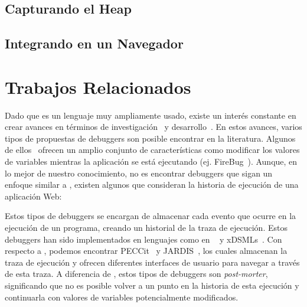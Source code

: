 \documentclass[conference]{IEEEtran}
\begin{document}
\subsection{Capturando el Heap}
\label{sec:heap}


\subsection{Integrando en un Navegador}


\bigskip

\section{Trabajos Relacionados}
\label{sec:rw}

Dado que \javascript es un lenguaje muy ampliamente usado, existe un inter\'es constante en crear avances en t\'erminos de investigaci\'on~\cite{vazquesAl:ist2018,legerAl:scp2013,legerAl:scp2015,zhengAl:www2011,chargueraudAl:www2018} y desarrollo~\cite{resig:jquery,angular,mckenzie:babel,rxjs}. En estos avances, varios tipos de propuestas de debuggers son posible encontrar en la literatura. Algunos de ellos~\cite{bartonOdvarko:www2011,jsbin,nodejsInspector} ofrecen un amplio conjunto de caracter\'isticas como modificar los valores de variables mientras la aplicaci\'on se est\'a ejecutando (ej. FireBug~\cite{bartonOdvarko:www2011}). Aunque, en lo mejor de nuestro conocimiento, no es encontrar debuggers que sigan un enfoque similar a \deloreanjs, existen algunos que consideran la historia de ejecuci\'on de una aplicaci\'on Web:       

\smallskip

 Estos tipos de debuggers se encargan de almacenar cada evento que ocurre en la ejecuci\'on de un programa, creando un historial de la traza de ejecuci\'on. Estos debuggers han sido implementados en lenguajes como en \java~\cite{tod:oopsla2007} y xDSMLs~\cite{bousseAl:SLE2015}. Con respecto a  \javascript, podemos encontrar PECCit~\cite{azar:2016} y JARDIS~\cite{barrAl:fse2016}, los cuales almacenan la traza de ejecuci\'on y ofrecen diferentes interfaces de usuario para navegar a trav\'es de esta traza. A diferencia de \deloreanjs, estos tipos de debuggers son {\em post-morter}, significando que no es posible volver a un punto en la historia de esta ejecuci\'on y continuarla con valores de variables potencialmente modificados. 
\end{document}
